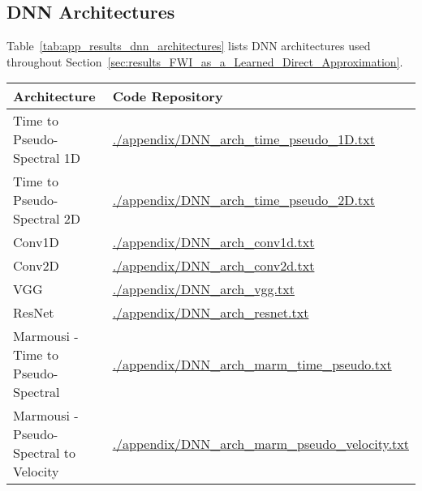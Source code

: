 \subsection{DNN Architectures}\label{sec:app_results_architectural_summary_dnn_workflow}
Table~\ref{tab:app_results_dnn_architectures} lists DNN architectures used throughout Section~\ref{sec:results_FWI_as_a_Learned_Direct_Approximation}.
\begin{table*}[ht]
    \footnotesize
    \centering
    \begin{tabular}{@{}ll@{}}\toprule
    Architecture                           & Code Repository    \\ \hline
    Time to Pseudo-Spectral 1D             & \href{https://gitfront.io/r/zerafachris/52df30fb666ba880749c8e951a3d056ce628a6cd/PhD/blob/code/appendix/DNN_arch_time_pseudo.txt}{\url{./appendix/DNN\_arch\_time\_pseudo_1D.txt}}\\
    Time to Pseudo-Spectral 2D             & \href{https://gitfront.io/r/zerafachris/52df30fb666ba880749c8e951a3d056ce628a6cd/PhD/blob/code/appendix/DNN_arch_time_pseudo.txt}{\url{./appendix/DNN\_arch\_time\_pseudo_2D.txt}}\\
    Conv1D                                 & \href{https://gitfront.io/r/zerafachris/52df30fb666ba880749c8e951a3d056ce628a6cd/PhD/blob/code/appendix/DNN_arch_conv1d.txt}{\url{./appendix/DNN\_arch\_conv1d.txt}}\\
    Conv2D                                 & \href{https://gitfront.io/r/zerafachris/52df30fb666ba880749c8e951a3d056ce628a6cd/PhD/blob/code/appendix/DNN_arch_conv2d.txt}{\url{./appendix/DNN\_arch\_conv2d.txt}}\\
    VGG                                    & \href{https://gitfront.io/r/zerafachris/52df30fb666ba880749c8e951a3d056ce628a6cd/PhD/blob/code/appendix/DNN_arch_vgg.txt}{\url{./appendix/DNN\_arch\_vgg.txt}}\\
    ResNet                                 & \href{https://gitfront.io/r/zerafachris/52df30fb666ba880749c8e951a3d056ce628a6cd/PhD/blob/code/appendix/DNN_arch_resnet.txt}{\url{./appendix/DNN\_arch\_resnet.txt}}\\
    Marmousi - Time to Pseudo-Spectral     & \href{https://gitfront.io/r/zerafachris/52df30fb666ba880749c8e951a3d056ce628a6cd/PhD/blob/code/appendix/DNN_arch_marm_time_pseudo.txt}{\url{./appendix/DNN\_arch\_marm\_time\_pseudo.txt}}\\
    Marmousi - Pseudo-Spectral to Velocity & \href{https://gitfront.io/r/zerafachris/52df30fb666ba880749c8e951a3d056ce628a6cd/PhD/blob/code/appendix/DNN_arch_marm_pseudo_velocity.txt}{\url{./appendix/DNN\_arch\_marm\_pseudo\_velocity.txt}}\\
    \hline
    \end{tabular}
    \caption{Repositories defining different architectures used in Section~\ref{sec:results_FWI_as_a_Learned_Direct_Approximation}.}\label{tab:app_results_dnn_architectures}
\end{table*}
